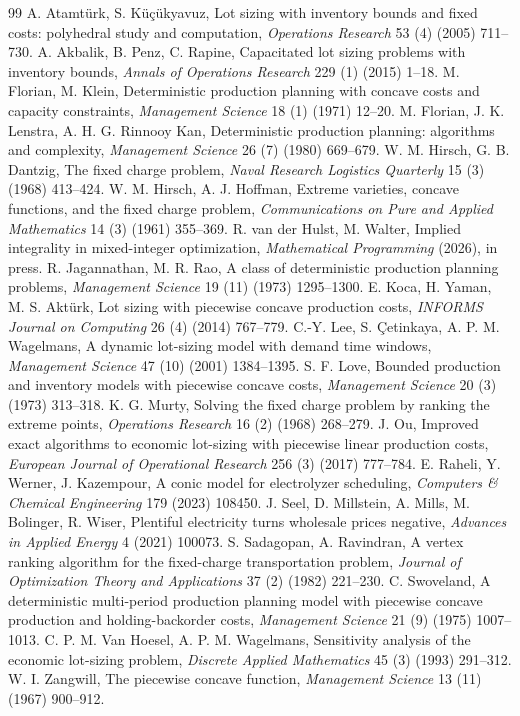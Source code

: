 \documentclass[3p,11pt]{elsarticle}
\theoremstyle{remark}
\theoremstyle{definition}
\begin{document}
\begin{thebibliography}{99}
 A. Atamt\"urk, S. K\"u\c{c}\"ukyavuz, Lot sizing with inventory bounds and
fixed costs: polyhedral study and computation, \emph{Operations Research} 53 (4) (2005)
711--730.
 A. Akbalik, B. Penz, C. Rapine, Capacitated lot sizing problems with
inventory bounds, \emph{Annals of Operations Research} 229 (1) (2015) 1--18.
 M. Florian, M. Klein, Deterministic production planning with concave costs
and capacity constraints, \emph{Management Science} 18 (1) (1971) 12--20.
 M. Florian, J. K. Lenstra, A. H. G. Rinnooy Kan, Deterministic production
planning: algorithms and complexity, \emph{Management Science} 26 (7) (1980) 669--679.
 W. M. Hirsch, G. B. Dantzig, The fixed charge problem, \emph{Naval
Research Logistics Quarterly} 15 (3) (1968) 413--424.
 W. M. Hirsch, A. J. Hoffman, Extreme varieties, concave functions, and
the fixed charge problem, \emph{Communications on Pure and Applied Mathematics} 14 (3)
(1961) 355--369.
 R. van der Hulst, M. Walter, Implied integrality in mixed-integer
optimization, \emph{Mathematical Programming} (2026), in press.
 R. Jagannathan, M. R. Rao, A class of deterministic production planning
problems, \emph{Management Science} 19 (11) (1973) 1295--1300.
 E. Koca, H. Yaman, M. S. Akt\"urk, Lot sizing with piecewise concave
production costs, \emph{INFORMS Journal on Computing} 26 (4) (2014) 767--779.
 C.-Y. Lee, S. \c{C}etinkaya, A. P. M. Wagelmans, A dynamic lot-sizing
model with demand time windows, \emph{Management Science} 47 (10) (2001) 1384--1395.
 S. F. Love, Bounded production and inventory models with piecewise
concave costs, \emph{Management Science} 20 (3) (1973) 313--318.
 K. G. Murty, Solving the fixed charge problem by ranking the extreme
points, \emph{Operations Research} 16 (2) (1968) 268--279.
 J. Ou, Improved exact algorithms to economic lot-sizing with piecewise
linear production costs, \emph{European Journal of Operational Research} 256 (3) (2017)
777--784.
 E. Raheli, Y. Werner, J. Kazempour, A conic model for electrolyzer
scheduling, \emph{Computers \& Chemical Engineering} 179 (2023) 108450.
 J. Seel, D. Millstein, A. Mills, M. Bolinger, R. Wiser, Plentiful
electricity turns wholesale prices negative, \emph{Advances in Applied Energy} 4 (2021)
100073.
 S. Sadagopan, A. Ravindran, A vertex ranking algorithm for the
fixed-charge transportation problem, \emph{Journal of Optimization Theory and
Applications} 37 (2) (1982) 221--230.
 C. Swoveland, A deterministic multi-period production planning
model with piecewise concave production and holding-backorder costs, \emph{Management
Science} 21 (9) (1975) 1007--1013.
 C. P. M. Van Hoesel, A. P. M. Wagelmans, Sensitivity analysis of the
economic lot-sizing problem, \emph{Discrete Applied Mathematics} 45 (3) (1993) 291--312.
 W. I. Zangwill, The piecewise concave function, \emph{Management
Science} 13 (11) (1967) 900--912.
\end{thebibliography}
\end{document}
